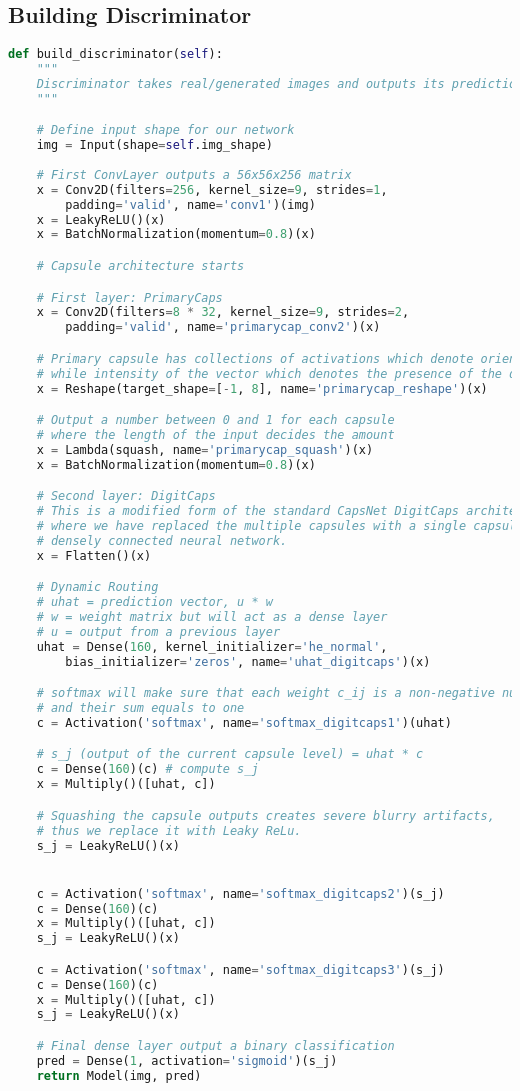 \subsection{Building Discriminator} %
\label{subsec:building_discriminator}
\begin{lstlisting}[basicstyle=\scriptsize,language=Python]
def build_discriminator(self):
    """
    Discriminator takes real/generated images and outputs its prediction.
    """

    # Define input shape for our network
    img = Input(shape=self.img_shape)
    
    # First ConvLayer outputs a 56x56x256 matrix
    x = Conv2D(filters=256, kernel_size=9, strides=1, 
        padding='valid', name='conv1')(img)
    x = LeakyReLU()(x)
    x = BatchNormalization(momentum=0.8)(x)

    # Capsule architecture starts

    # First layer: PrimaryCaps
    x = Conv2D(filters=8 * 32, kernel_size=9, strides=2, 
        padding='valid', name='primarycap_conv2')(x)

    # Primary capsule has collections of activations which denote orientation
    # while intensity of the vector which denotes the presence of the digit)
    x = Reshape(target_shape=[-1, 8], name='primarycap_reshape')(x)

    # Output a number between 0 and 1 for each capsule 
    # where the length of the input decides the amount
    x = Lambda(squash, name='primarycap_squash')(x)
    x = BatchNormalization(momentum=0.8)(x)

    # Second layer: DigitCaps
    # This is a modified form of the standard CapsNet DigitCaps architecture 
    # where we have replaced the multiple capsules with a single capsule of 
    # densely connected neural network.
    x = Flatten()(x)

    # Dynamic Routing
    # uhat = prediction vector, u * w
    # w = weight matrix but will act as a dense layer
    # u = output from a previous layer
    uhat = Dense(160, kernel_initializer='he_normal', 
        bias_initializer='zeros', name='uhat_digitcaps')(x)

    # softmax will make sure that each weight c_ij is a non-negative number 
    # and their sum equals to one
    c = Activation('softmax', name='softmax_digitcaps1')(uhat) 

    # s_j (output of the current capsule level) = uhat * c
    c = Dense(160)(c) # compute s_j
    x = Multiply()([uhat, c])

    # Squashing the capsule outputs creates severe blurry artifacts, 
    # thus we replace it with Leaky ReLu.
    s_j = LeakyReLU()(x)


    c = Activation('softmax', name='softmax_digitcaps2')(s_j) 
    c = Dense(160)(c)
    x = Multiply()([uhat, c])
    s_j = LeakyReLU()(x)

    c = Activation('softmax', name='softmax_digitcaps3')(s_j) 
    c = Dense(160)(c)
    x = Multiply()([uhat, c])
    s_j = LeakyReLU()(x)

    # Final dense layer output a binary classification
    pred = Dense(1, activation='sigmoid')(s_j)
    return Model(img, pred)
\end{lstlisting}

